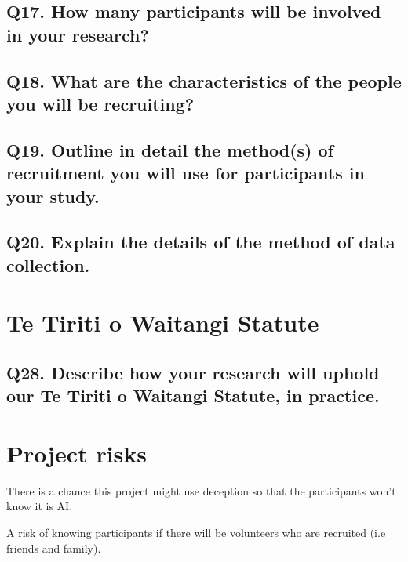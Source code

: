 \documentclass[11pt, a4paper]{article}
\begin{document}
\subsection{Q17. How many participants will be involved in your research?}

\subsection{Q18. What are the characteristics of the people you will be recruiting?}

\subsection{Q19. Outline in detail the method(s) of recruitment you will use for participants in your study.}

\subsection{Q20. Explain the details of the method of data collection.}

\section{Te Tiriti o Waitangi Statute}

\subsection{Q28. Describe how your research will uphold our Te Tiriti o Waitangi Statute, in practice.}

\section{Project risks}

There is a chance this project might use deception so that the participants won't know it is AI.

A risk of knowing participants if there will be volunteers who are recruited (i.e friends and family).
\end{document}
